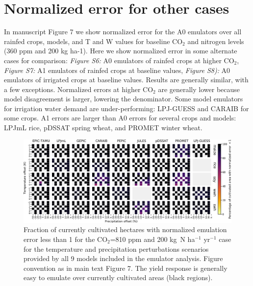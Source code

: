 \documentclass[12pt]{article}
\begin{document}

\clearpage
\section{Normalized error for other cases}
\begin{justify}
In manuscript Figure 7 we show normalized error for the A0 emulators over all rainfed crops, models, and T and W values for 
	baseline CO$_2$ and nitrogen levels (360 ppm and 200 kg ha-1). Here we show normalized error in some alternate cases for comparison: \textit{Figure S6:} A0 emulators of rainfed crops at higher CO$_2$, \textit{Figure S7:} A1 emulators of rainfed crops at baseline values, \textit{Figure S8):} A0 emulators of irrigated crops at 
baseline values. 
Results are generally similar, with a few exceptions. Normalized errors at higher CO$_2$ are generally lower because model disagreement is larger, lowering the denominator. Some model emulators for irrigation water demand are under-performing: LPJ-GUESS and CARAIB for some crops.
A1 errors are larger than A0 errors for several crops and models: LPJmL rice, pDSSAT spring wheat, and PROMET winter wheat.
\end{justify}

\vspace{1in}

\begin{figure}[h!]
  \centering
  \includegraphics[width=15.5cm]{error_grid_810.png}
  \caption{
  Fraction of currently cultivated hectares with normalized emulation error less than 1 for the CO$_2$=810 ppm and 200 kg~N ha$^{-1}$ yr$^{-1}$ case for the temperature and precipitation perturbations scenarios provided by all 9 models included in the emulator analysis. 
  Figure convention as in main text Figure 7.
  The yield response is generally easy to emulate over currently cultivated areas (black regions).
  }
  \label{fig:error810}
\end{figure}
\end{document}
